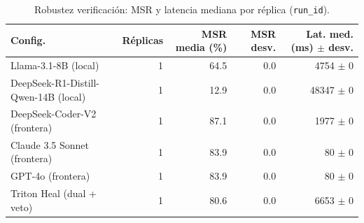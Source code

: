 \begin{table}[ht]
\centering
\caption{Robustez verificación: MSR y latencia mediana por réplica (\texttt{run\_id}).}
\label{tab:robustness}
\footnotesize
\begin{tabular}{@{}lrrrr@{}}
\toprule
Config. & Réplicas & MSR media (\%) & MSR desv. & Lat. med. (ms) $\pm$ desv. \\
\midrule
Llama-3.1-8B (local) & 1 & 64.5 & 0.0 & 4754 $\pm$ 0 \\
DeepSeek-R1-Distill-Qwen-14B (local) & 1 & 12.9 & 0.0 & 48347 $\pm$ 0 \\
DeepSeek-Coder-V2 (frontera) & 1 & 87.1 & 0.0 & 1977 $\pm$ 0 \\
Claude 3.5 Sonnet (frontera) & 1 & 83.9 & 0.0 & 80 $\pm$ 0 \\
GPT-4o (frontera) & 1 & 83.9 & 0.0 & 80 $\pm$ 0 \\
Triton Heal (dual + veto) & 1 & 80.6 & 0.0 & 6653 $\pm$ 0 \\
\bottomrule
\end{tabular}
\end{table}